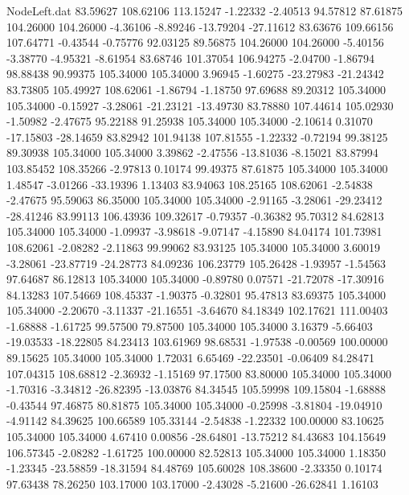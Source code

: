 \begin{filecontents}{NodeLeft.dat}
  83.59627  108.62106  113.15247    -1.22332   -2.40513   94.57812   87.61875  104.26000  104.26000   -4.36106   -8.89246  -13.79204  -27.11612
  83.63676  109.66156  107.64771    -0.43544   -0.75776   92.03125   89.56875  104.26000  104.26000   -5.40156   -3.38770   -4.95321   -8.61954
  83.68746  101.37054  106.94275    -2.04700   -1.86794   98.88438   90.99375  105.34000  105.34000    3.96945   -1.60275  -23.27983  -21.24342
  83.73805  105.49927  108.62061    -1.86794   -1.18750   97.69688   89.20312  105.34000  105.34000   -0.15927   -3.28061  -21.23121  -13.49730
  83.78880  107.44614  105.02930    -1.50982   -2.47675   95.22188   91.25938  105.34000  105.34000   -2.10614    0.31070  -17.15803  -28.14659
  83.82942  101.94138  107.81555    -1.22332   -0.72194   99.38125   89.30938  105.34000  105.34000    3.39862   -2.47556  -13.81036   -8.15021
  83.87994  103.85452  108.35266    -2.97813    0.10174   99.49375   87.61875  105.34000  105.34000    1.48547   -3.01266  -33.19396    1.13403
  83.94063  108.25165  108.62061    -2.54838   -2.47675   95.59063   86.35000  105.34000  105.34000   -2.91165   -3.28061  -29.23412  -28.41246
  83.99113  106.43936  109.32617    -0.79357   -0.36382   95.70312   84.62813  105.34000  105.34000   -1.09937   -3.98618   -9.07147   -4.15890
  84.04174  101.73981  108.62061    -2.08282   -2.11863   99.99062   83.93125  105.34000  105.34000    3.60019   -3.28061  -23.87719  -24.28773
  84.09236  106.23779  105.26428    -1.93957   -1.54563   97.64687   86.12813  105.34000  105.34000   -0.89780    0.07571  -21.72078  -17.30916
  84.13283  107.54669  108.45337    -1.90375   -0.32801   95.47813   83.69375  105.34000  105.34000   -2.20670   -3.11337  -21.16551   -3.64670
  84.18349  102.17621  111.00403    -1.68888   -1.61725   99.57500   79.87500  105.34000  105.34000    3.16379   -5.66403  -19.03533  -18.22805
  84.23413  103.61969   98.68531    -1.97538   -0.00569  100.00000   89.15625  105.34000  105.34000    1.72031    6.65469  -22.23501   -0.06409
  84.28471  107.04315  108.68812    -2.36932   -1.15169   97.17500   83.80000  105.34000  105.34000   -1.70316   -3.34812  -26.82395  -13.03876
  84.34545  105.59998  109.15804    -1.68888   -0.43544   97.46875   80.81875  105.34000  105.34000   -0.25998   -3.81804  -19.04910   -4.91142
  84.39625  100.66589  105.33144    -2.54838   -1.22332  100.00000   83.10625  105.34000  105.34000    4.67410    0.00856  -28.64801  -13.75212
  84.43683  104.15649  106.57345    -2.08282   -1.61725  100.00000   82.52813  105.34000  105.34000    1.18350   -1.23345  -23.58859  -18.31594
  84.48769  105.60028  108.38600    -2.33350    0.10174   97.63438   78.26250  103.17000  103.17000   -2.43028   -5.21600  -26.62841    1.16103

\end{filecontents}
